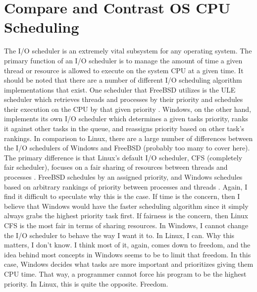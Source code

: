 \documentclass[letterpaper,10pt,draftclsnofoot,onecolumn]{IEEEtran}
\begin{document}
\section{Compare and Contrast OS CPU Scheduling}
The I/O scheduler is an extremely vital subsystem for any operating system. The primary function of an I/O scheduler is to manage the amount of time a given thread or resource is allowed to execute on the system CPU at a given time. It should be noted that there are a number of different I/O scheduling algorithm implementations that exist. One scheduler that FreeBSD utilizes is the ULE scheduler which retrieves threads and processes by their priority and schedules their execution on the CPU by that given priority \cite{FreeBSD1}. Windows, on the other hand, implements its own I/O scheduler which determines a given tasks priority, ranks it against other tasks in the queue, and reassigns priority based on other task’s rankings.
In comparison to Linux, there are a large number of differences between the I/O schedulers of Windows and FreeBSD (probably too many to cover here). The primary difference is that Linux’s default I/O scheduler, CFS (completely fair scheduler), focuses on a fair sharing of resources between threads and processes \cite{Linux}. FreeBSD schedules by an assigned priority, and Windows schedules based on arbitrary rankings of priority between processes and threads \cite{MSWindows1} \cite{FreeBSD1}. Again, I find it difficult to speculate why this is the case. If time is the concern, then I believe that Windows would have the faster scheduling algorithm since it simply always grabs the highest priority task first. If fairness is the concern, then Linux CFS is the most fair in terms of sharing resources. In Windows, I cannot change the I/O scheduler to behave the way I want it to. In Linux, I can. Why this matters, I don’t know. I think most of it, again, comes down to freedom, and the idea behind most concepts in Windows seems to be to limit that freedom. In this case, Windows decides what tasks are more important and prioritizes giving them CPU time. That way, a programmer cannot force his program to be the highest priority. In Linux, this is quite the opposite. Freedom.\\

\newpage


\end{document}
